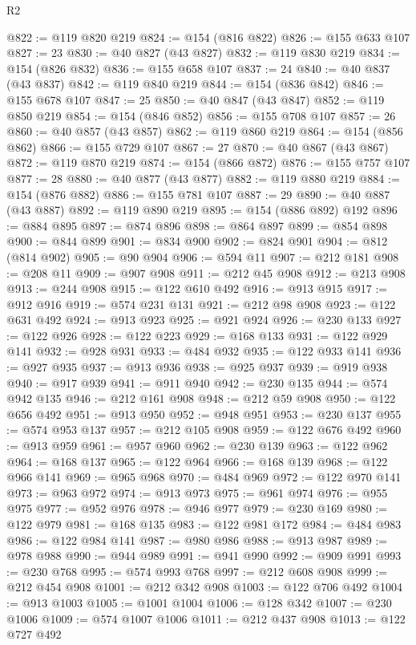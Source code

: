 \begin{lexlean}{R2}
\begin{coremodule}
{{{{{{{{{{{{{{{{{{{{{{{{{{{{{{{{{{{{{{{{{{{{{{{{{{{{{{{{{{{{{{{{{{{{{{{{{{{{{{{{{{{{{{{{{{{{@822 := @119 @820 @219
@824 := @154 (@816 @822)
@826 := @155 @633 @107
@827 := 23
@830 := @40 @827 (@43 @827)
@832 := @119 @830 @219
@834 := @154 (@826 @832)
@836 := @155 @658 @107
@837 := 24
@840 := @40 @837 (@43 @837)
@842 := @119 @840 @219
@844 := @154 (@836 @842)
@846 := @155 @678 @107
@847 := 25
@850 := @40 @847 (@43 @847)
@852 := @119 @850 @219
@854 := @154 (@846 @852)
@856 := @155 @708 @107
@857 := 26
@860 := @40 @857 (@43 @857)
@862 := @119 @860 @219
@864 := @154 (@856 @862)
@866 := @155 @729 @107
@867 := 27
@870 := @40 @867 (@43 @867)
@872 := @119 @870 @219
@874 := @154 (@866 @872)
@876 := @155 @757 @107
@877 := 28
@880 := @40 @877 (@43 @877)
@882 := @119 @880 @219
@884 := @154 (@876 @882)
@886 := @155 @781 @107
@887 := 29
@890 := @40 @887 (@43 @887)
@892 := @119 @890 @219
@895 := @154 (@886 @892) @192
@896 := @884 @895
@897 := @874 @896
@898 := @864 @897
@899 := @854 @898
@900 := @844 @899
@901 := @834 @900
@902 := @824 @901
@904 := @812 (@814 @902)
@905 := @90 @904
@906 := @594 @11
@907 := @212 @181
@908 := @208 @11
@909 := @907 @908
@911 := @212 @45 @908
@912 := @213 @908
@913 := @244 @908
@915 := @122 @610 @492
@916 := @913 @915
@917 := @912 @916
@919 := @574 @231 @131
@921 := @212 @98 @908
@923 := @122 @631 @492
@924 := @913 @923
@925 := @921 @924
@926 := @230 @133
@927 := @122 @926
@928 := @122 @223
@929 := @168 @133
@931 := @122 @929 @141
@932 := @928 @931
@933 := @484 @932
@935 := @122 @933 @141
@936 := @927 @935
@937 := @913 @936
@938 := @925 @937
@939 := @919 @938
@940 := @917 @939
@941 := @911 @940
@942 := @230 @135
@944 := @574 @942 @135
@946 := @212 @161 @908
@948 := @212 @59 @908
@950 := @122 @656 @492
@951 := @913 @950
@952 := @948 @951
@953 := @230 @137
@955 := @574 @953 @137
@957 := @212 @105 @908
@959 := @122 @676 @492
@960 := @913 @959
@961 := @957 @960
@962 := @230 @139
@963 := @122 @962
@964 := @168 @137
@965 := @122 @964
@966 := @168 @139
@968 := @122 @966 @141
@969 := @965 @968
@970 := @484 @969
@972 := @122 @970 @141
@973 := @963 @972
@974 := @913 @973
@975 := @961 @974
@976 := @955 @975
@977 := @952 @976
@978 := @946 @977
@979 := @230 @169
@980 := @122 @979
@981 := @168 @135
@983 := @122 @981 @172
@984 := @484 @983
@986 := @122 @984 @141
@987 := @980 @986
@988 := @913 @987
@989 := @978 @988
@990 := @944 @989
@991 := @941 @990
@992 := @909 @991
@993 := @230 @768
@995 := @574 @993 @768
@997 := @212 @608 @908
@999 := @212 @454 @908
@1001 := @212 @342 @908
@1003 := @122 @706 @492
@1004 := @913 @1003
@1005 := @1001 @1004
@1006 := @128 @342
@1007 := @230 @1006
@1009 := @574 @1007 @1006
@1011 := @212 @437 @908
@1013 := @122 @727 @492
}}}}}}}}}}}}}}}}}}}}}}}}}}}}}}}}}}}}}}}}}}}}}}}}}}}}}}}}}}}}}}}}}}}}}}}}}}}}}}}}}}}}}}}}}}}}
\end{coremodule}
\end{lexlean}
